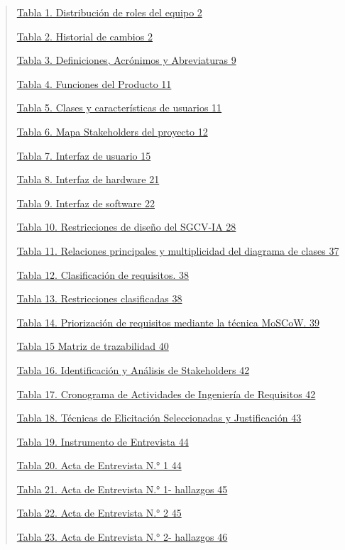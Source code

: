 \documentclass[
]{article}
\begin{document}
\begin{quote}
\hyperref[_bookmark1]{Tabla 1. Distribución de roles del equipo 2}

\hyperref[_bookmark2]{Tabla 2. Historial de cambios 2}

\hyperref[_bookmark8]{Tabla 3. Definiciones, Acrónimos y Abreviaturas 9}

\hyperref[_bookmark15]{Tabla 4. Funciones del Producto 11}

\hyperref[_bookmark17]{Tabla 5. Clases y características de usuarios 11}

\hyperref[_bookmark19]{Tabla 6. Mapa Stakeholders del proyecto 12}

\hyperref[_bookmark24]{Tabla 7. Interfaz de usuario 15}

\hyperref[_bookmark36]{Tabla 8. Interfaz de hardware 21}

\hyperref[tabla-9.-interfaz-de-software]{Tabla 9. Interfaz de software
22}

\hyperref[_bookmark41]{Tabla 10. Restricciones de diseño del SGCV-IA 28}

\hyperref[_bookmark56]{Tabla 11. Relaciones principales y multiplicidad
del diagrama de clases 37}

\hyperref[_bookmark61]{Tabla 12. Clasificación de requisitos. 38}

\hyperref[_bookmark62]{Tabla 13. Restricciones clasificadas 38}

\hyperref[_bookmark64]{Tabla 14. Priorización de requisitos mediante la
técnica MoSCoW. 39}

\hyperref[_bookmark66]{Tabla 15 Matriz de trazabilidad 40}

\hyperref[_bookmark70]{Tabla 16. Identificación y Análisis de
Stakeholders 42}

\hyperref[_bookmark72]{Tabla 17. Cronograma de Actividades de Ingeniería
de Requisitos 42}

\hyperref[_bookmark74]{Tabla 18. Técnicas de Elicitación Seleccionadas y
Justificación 43}

\hyperref[_bookmark77]{Tabla 19. Instrumento de Entrevista 44}

\hyperref[_bookmark79]{Tabla 20. Acta de Entrevista N.° 1 44}

\hyperref[_bookmark80]{Tabla 21. Acta de Entrevista N.° 1- hallazgos 45}

\hyperref[_bookmark81]{Tabla 22. Acta de Entrevista N.° 2 45}

\hyperref[_bookmark82]{Tabla 23. Acta de Entrevista N.° 2- hallazgos 46}


\end{quote}
\end{document}
